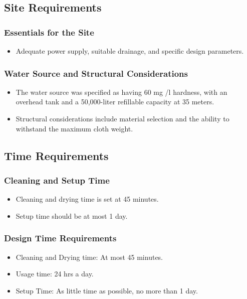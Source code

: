 \documentclass[table,french,english]{rapportCS}
\begin{document}
\subsection{Site Requirements}\label{sec:sitereq}
\subsubsection{Essentials for the Site}\label{sec:essenforsite}
    \begin{itemize}[label=$\bullet$]
      \item Adequate power supply, suitable drainage, and specific design parameters.
    \end{itemize}
  
 \subsubsection{Water Source and Structural Considerations}\label{sec:watersource}
    \begin{itemize}[label=$\bullet$]
      \item The water source was specified as having 60 mg /l hardness, with an overhead tank and a 50,000-liter refillable capacity at 35 meters.
      \item Structural considerations include material selection and the ability to withstand the maximum cloth weight.
    \end{itemize}

\subsection{Time Requirements}\label{sec:timereq}
\subsubsection{Cleaning and Setup Time}\label{sec: cnstimes}
    \begin{itemize}[label=$\bullet$]
      \item Cleaning and drying time is set at 45 minutes.
      \item Setup time should be at most 1 day.
    \end{itemize}
\subsubsection{Design Time Requirements}\label{sec: destimereq}
    \begin{itemize}[label=$\bullet$]
      \item Cleaning and Drying time: At most  45 minutes.
      \item Usage time: 24 hrs a day.
      \item Setup Time: As little time as possible, no more than 1 day.
    \end{itemize}
  
\end{document}
